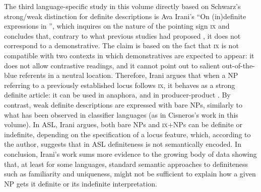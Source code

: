 \documentclass[output=paper]{langsci/langscibook}
\begin{document}
The third language-specific study in this volume directly based on Schwarz’s strong/weak distinction for definite descriptions is Ava Irani’s “On (in)definite expressions in ”, which inquires on the nature of the pointing sign \textsc{ix} and concludes that, contrary to what previous studies had proposed \citep{KoulidobrovaLilloMartin2016}, it does not correspond to a demonstrative. The claim is based on the fact that \textsc{ix} is not compatible with two contexts in which demonstratives are expected to appear: it does not allow contrastive readings, and it cannot point out to salient out-of-the-blue referents in a neutral location. Therefore, Irani argues that when a NP referring to a previously established locus follows \textsc{ix}, it behaves as a strong definite article: it can be used in anaphora, and in producer-product . By contrast, weak definite descriptions are expressed with bare NPs, similarly to what has been observed in classifier languages (as in Cisneros’s work in this volume). In ASL, Irani argues, both bare NPs and \textsc{ix}+NPs can be definite or indefinite, depending on the specification of a locus feature, which, according to the author, suggests that in ASL definiteness is not semantically encoded. In conclusion, Irani’s work sums more evidence to the growing body of data showing that, at least for some languages, standard semantic approaches to definiteness such as familiarity and uniqueness, might not be sufficient to explain how a given NP gets it definite or its indefinite interpretation.\pagebreak
\end{document}
